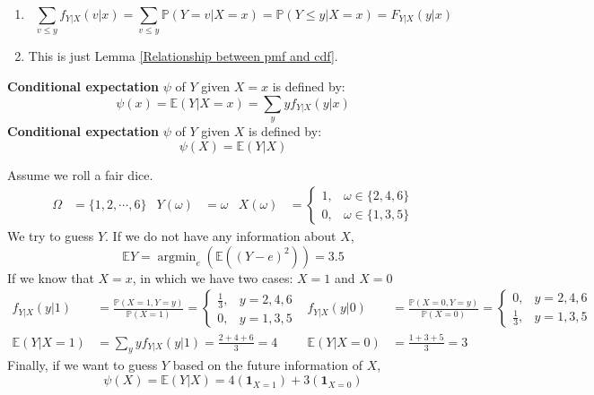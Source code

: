 \documentclass{huhtakm-template-book}
\newcommand{\prob}{\mathbb{P}}
\newcommand{\expect}{\mathbb{E}}
\DeclareMathOperator*{\argmin}{argmin}
\begin{document}
    \begin{proofing}
        \begin{enumerate}
            \item 
            \begin{equation*}
                \sum_{v\leq y}f_{Y|X}(v|x)=\sum_{v\leq y}\prob(Y=v|X=x)=\prob(Y\leq y|X=x)=F_{Y|X}(y|x)
            \end{equation*}
            \item 
            This is just Lemma \ref{Relationship between pmf and cdf}.
        \end{enumerate}
    \end{proofing}

    \newpage
    \begin{defn}
        \textbf{Conditional expectation} $\psi$ of $Y$ given $X=x$ is defined by:
        \begin{equation*}
            \psi(x)=\expect(Y|X=x)=\sum_{y}yf_{Y|X}(y|x)
        \end{equation*}
        \textbf{Conditional expectation} $\psi$ of $Y$ given $X$ is defined by:
        \begin{equation*}
            \psi(X)=\expect(Y|X)
        \end{equation*}
    \end{defn}
    \begin{eg}
        Assume we roll a fair dice.
        \begin{align*}
            \Omega&=\{1,2,\cdots,6\} & Y(\omega)&=\omega & X(\omega)&=\begin{cases}
                1, &\omega\in\{2,4,6\}\\
                0, &\omega\in\{1,3,5\}
            \end{cases}
        \end{align*}
        We try to guess $Y$. If we do not have any information about $X$, 
        \begin{equation*}
            \expect Y=\argmin_{e}(\expect((Y-e)^{2}))=3.5
        \end{equation*}
        If we know that $X=x$, in which we have two cases: $X=1$ and $X=0$
        \begin{align*}
            f_{Y|X}(y|1)&=\frac{\prob(X=1,Y=y)}{\prob(X=1)}=\begin{cases}
                \frac{1}{3}, &y=2,4,6\\
                0, &y=1,3,5
            \end{cases} & f_{Y|X}(y|0)&=\frac{\prob(X=0,Y=y)}{\prob(X=0)}=\begin{cases}
                0, &y=2,4,6\\
                \frac{1}{3}, &y=1,3,5
            \end{cases}\\
            \expect(Y|X=1)&=\sum_{y}yf_{Y|X}(y|1)=\frac{2+4+6}{3}=4 & \expect(Y|X=0)&=\frac{1+3+5}{3}=3
        \end{align*}
        Finally, if we want to guess $Y$ based on the future information of $X$,
        \begin{equation*}
            \psi(X)=\expect(Y|X)=4(\mathbf{1}_{X=1})+3(\mathbf{1}_{X=0})
        \end{equation*}
    \end{eg}
\end{document}
